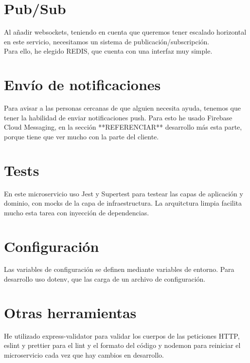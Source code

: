 \section{Pub/Sub}
Al añadir websockets, teniendo en cuenta que queremos tener escalado horizontal en este servicio,
necesitamos un sistema de publicación/subscripción. \\
Para ello, he elegido REDIS, que cuenta con una interfaz muy simple. 

\section{Envío de notificaciones}
Para avisar a las personas cercanas de que alguien necesita ayuda, tenemos que tener la habilidad de enviar
notificaciones push. Para esto he usado Firebase Cloud Messaging, en la sección **REFERENCIAR** desarrollo más 
esta parte, porque tiene que ver mucho con la parte del cliente.

\section{Tests}
En este microservicio uso Jest y Supertest para testear las capas de aplicación y dominio, con mocks de la capa de infraestructura.
La arquitctura limpia facilita mucho esta tarea con inyección de dependencias.

\section{Configuración}
Las variables de configuración se definen mediante variables de entorno. Para desarrollo uso dotenv, 
que las carga de un archivo de configuración.

\section{Otras herramientas}
He utilizado express-validator para validar los cuerpos de las peticiones HTTP, eslint y prettier para 
el lint y el formato del código y nodemon para reiniciar el microservicio cada vez que hay cambios en desarrollo.